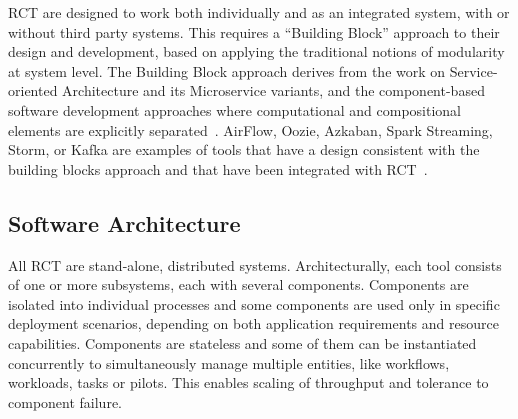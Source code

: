 \documentclass[preprint,12pt, a4paper]{elsarticle}
\begin{document}
RCT are designed to work both individually and as an integrated system, with
or without third party systems. This requires a ``Building Block'' approach
to their design and development, based on applying the traditional notions of
modularity at system level. The Building Block approach derives from the work
on Service-oriented Architecture and its Microservice variants, and the
component-based software development approaches where computational and
compositional elements are explicitly
separated~\cite{batory1992design,garlan1995architectural,lenz1988software,clemens1998component,schneider2000components}.
AirFlow, Oozie, Azkaban, Spark Streaming, Storm, or Kafka are examples of
tools that have a design consistent with the building blocks approach and
that have been integrated with RCT~\cite{}.


\subsection{Software Architecture}\label{ssec:architecture}


All RCT are stand-alone, distributed systems. Architecturally, each tool
consists of one or more subsystems, each with several components. Components
are isolated into individual processes and some components are used only in
specific deployment scenarios, depending on both application requirements and
resource capabilities. Components are stateless and some of them can be
instantiated concurrently to simultaneously manage multiple entities, like
workflows, workloads, tasks or pilots. This enables scaling of throughput and
tolerance to component failure.
\end{document}
